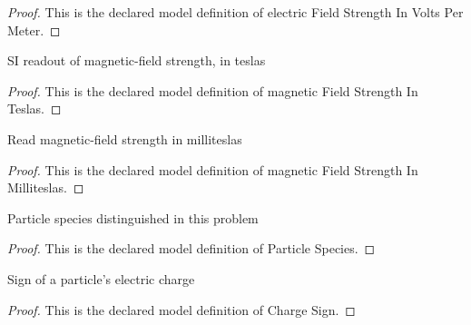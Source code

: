 \begin{proof}
  This is the declared model definition of electric Field Strength In Volts Per Meter.
\end{proof}
\begin{definition}
  \label{def:physics:phyx-mini-0639:phyxminiproblems-problemphyxmini0639-magneticfieldstrengthinteslas}
  SI readout of magnetic-field strength, in teslas
\end{definition}
\begin{proof}
  This is the declared model definition of magnetic Field Strength In Teslas.
\end{proof}
\begin{definition}
  \label{def:physics:phyx-mini-0639:phyxminiproblems-problemphyxmini0639-magneticfieldstrengthinmilliteslas}
  Read magnetic-field strength in milliteslas
\end{definition}
\begin{proof}
  This is the declared model definition of magnetic Field Strength In Milliteslas.
\end{proof}
\begin{definition}
  \label{def:physics:phyx-mini-0639:phyxminiproblems-problemphyxmini0639-particlespecies}
  Particle species distinguished in this problem
\end{definition}
\begin{proof}
  This is the declared model definition of Particle Species.
\end{proof}
\begin{definition}
  \label{def:physics:phyx-mini-0639:phyxminiproblems-problemphyxmini0639-chargesign}
  Sign of a particle's electric charge
\end{definition}
\begin{proof}
  This is the declared model definition of Charge Sign.
\end{proof}
